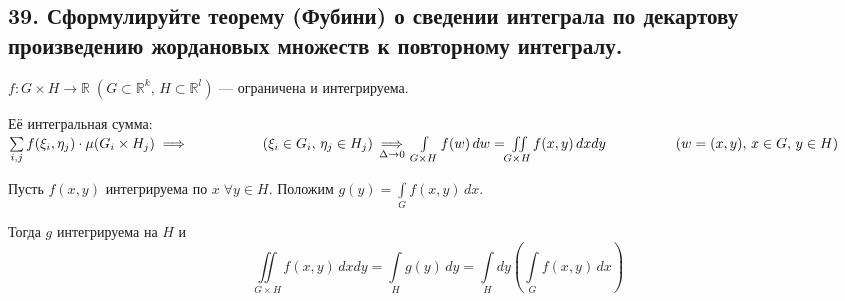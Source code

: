 
\subsection*{39. Сформулируйте теорему (Фубини) о сведении интеграла по декартову произведению жордановых множеств к повторному интегралу.}
    \begin{theorem}[Фубини]
        $f : G \times H \to \mathbb{R} \; (G \subset \mathbb{R}^k, \, H \subset \mathbb{R}^l)$
        --- ограничена и интегрируема.
        
        Её интегральная сумма: $\sum\limits_{i, j} f(\xi_i, \eta_j) \cdot \mu(G_i \times H_j) \implies 
        \hspace{50 pt} (\xi_i \in G_i, \, \eta_j \in H_j) \\
        \underset{\Delta \to 0}{\implies} \int\limits_{G \times H} f(w)\, dw = \iint\limits_{G \times H}
        f(x, y)\, dxdy \hspace{50 pt} (w = (x, y),\, x \in G,\, y \in H)$
        
        Пусть $f(x, y)$ интегрируема по $x \; \forall y \in H$. Положим $g(y) = \int\limits_G f(x, y)\, dx$.
        
        Тогда $g$ интегрируема на $H$ и 
        \[ \iint\limits_{G \times H} f(x, y)\, dxdy = \int\limits_H g(y)\, dy
        = \int\limits_H dy \left( \int\limits_G f(x, y)\, dx \right) \]
    \end{theorem}

